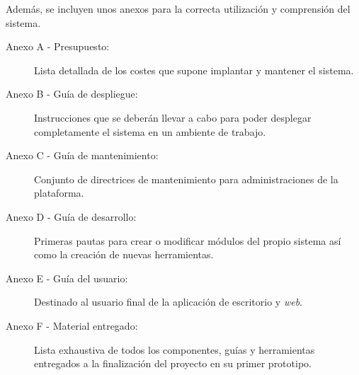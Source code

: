 Además, se incluyen unos anexos para la correcta utilización y 
comprensión del sistema.

\begin{description}
\item[Anexo A - Presupuesto:] Lista detallada de los costes que supone 
implantar y mantener el sistema.
\item[Anexo B - Guía de despliegue:] Instrucciones que se deberán 
llevar a cabo para poder desplegar completamente el sistema en un 
ambiente de trabajo.
\item[Anexo C - Guía de mantenimiento:] Conjunto de directrices de 
mantenimiento para administraciones de la plataforma.
\item[Anexo D - Guía de desarrollo:] Primeras pautas para crear o 
modificar módulos del propio sistema así como la creación de nuevas 
herramientas.
\item[Anexo E - Guía del usuario:] Destinado al usuario final de la 
aplicación de escritorio y \emph{web}.
\item[Anexo F - Material entregado:] Lista exhaustiva de todos los 
componentes, guías y herramientas entregados a la finalización del 
proyecto en su primer prototipo.
\end{description}

\cleardoublepage


